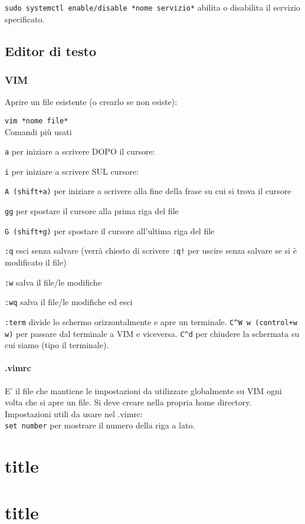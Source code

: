 \documentclass[]{report}
\begin{document}
\noindent \verb|sudo systemctl enable/disable *nome servizio*| abilita o disabilita il servizio specificato.



\newpage
\section{Editor di testo}
\subsection{VIM}
Aprire un file esistente (o crearlo se non esiste):

\verb|vim *nome file*|\\

\noindent Comandi più usati

\verb|a| per iniziare a scrivere DOPO il cursore:

\verb|i| per iniziare a scrivere SUL cursore:

\verb|A (shift+a)| per iniziare a scrivere alla fine della frase su cui si trova il cursore

\verb|gg| per spostare il cursore alla prima riga del file

\verb|G (shift+g)| per spostare il cursore all'ultima riga del file

\verb|:q| esci senza salvare (verrà chiesto di scrivere \verb|:q!| per uscire senza salvare se si è modificato il file)

\verb|:w| salva il file/le modifiche

\verb|:wq| salva il file/le modifiche ed esci

\verb|:term| divide lo schermo orizzontalmente e apre un terminale. \verb|C^W w (control+w w)| per passare dal terminale a VIM e viceversa. \verb|C^d| per chiudere la schermata su cui siamo (tipo il terminale).

\subsubsection{.vimrc}
E' il file che mantiene le impostazioni da utilizzare globalmente su VIM ogni volta che si apre un file. Si deve creare nella propria home directory.\\

Impostazioni utili da usare nel .vimrc:\\
\verb|set number| per  mostrare il numero della riga a lato.\\
\verb||


\chapter{title}
\chapter{title}
\end{document}
